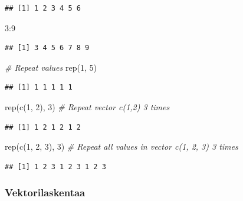 \documentclass[
]{book}
\newenvironment{Shaded}{\begin{snugshade}}{\end{snugshade}}
\newcommand{\CommentTok}[1]{\textcolor[rgb]{0.56,0.35,0.01}{\textit{#1}}}
\newcommand{\DecValTok}[1]{\textcolor[rgb]{0.00,0.00,0.81}{#1}}
\newcommand{\FunctionTok}[1]{\textcolor[rgb]{0.00,0.00,0.00}{#1}}
\newcommand{\NormalTok}[1]{#1}
\newcommand{\SpecialCharTok}[1]{\textcolor[rgb]{0.00,0.00,0.00}{#1}}
\begin{document}
\begin{verbatim}
## [1] 1 2 3 4 5 6
\end{verbatim}

\begin{Shaded}
\begin{Highlighting}[]
\DecValTok{3}\SpecialCharTok{:}\DecValTok{9}
\end{Highlighting}
\end{Shaded}

\begin{verbatim}
## [1] 3 4 5 6 7 8 9
\end{verbatim}

\begin{Shaded}
\begin{Highlighting}[]
\CommentTok{\# Repeat values}
\FunctionTok{rep}\NormalTok{(}\DecValTok{1}\NormalTok{, }\DecValTok{5}\NormalTok{)}
\end{Highlighting}
\end{Shaded}

\begin{verbatim}
## [1] 1 1 1 1 1
\end{verbatim}

\begin{Shaded}
\begin{Highlighting}[]
\FunctionTok{rep}\NormalTok{(}\FunctionTok{c}\NormalTok{(}\DecValTok{1}\NormalTok{, }\DecValTok{2}\NormalTok{), }\DecValTok{3}\NormalTok{) }\CommentTok{\# Repeat vector c(1,2) 3 times}
\end{Highlighting}
\end{Shaded}

\begin{verbatim}
## [1] 1 2 1 2 1 2
\end{verbatim}

\begin{Shaded}
\begin{Highlighting}[]
\FunctionTok{rep}\NormalTok{(}\FunctionTok{c}\NormalTok{(}\DecValTok{1}\NormalTok{, }\DecValTok{2}\NormalTok{, }\DecValTok{3}\NormalTok{), }\DecValTok{3}\NormalTok{) }\CommentTok{\# Repeat all values in vector c(1, 2, 3) 3 times}
\end{Highlighting}
\end{Shaded}

\begin{verbatim}
## [1] 1 2 3 1 2 3 1 2 3
\end{verbatim}

\hypertarget{vektorilaskentaa}{%
\subsubsection{Vektorilaskentaa}\label{vektorilaskentaa}}
\end{document}
